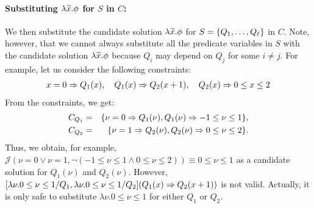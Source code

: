 \paragraph{Substituting \(\lambda \widetilde{x}.\phi\) for \(S\) in \(C\):}
We then substitute the candidate solution \(\lambda \widetilde{x}.\phi\) for
\(S=\{{Q_1,\dots,Q_{\ell}}\}\) in \(C\).  Note, however, that we cannot
always substitute all the predicate variables in \(S\) with the
candidate solution \(\lambda\widetilde{x}.\phi\) because \(Q_i\) may depend on
\(Q_j\) for some \(i \neq j\).  For example, let us consider the
following constraints:
\begin{eqnarray*}
x=0 \Rightarrow Q_1(x), \quad
Q_1(x) \Rightarrow Q_2(x+1), \quad
Q_2(x) \Rightarrow 0 \leq x \leq 2
\end{eqnarray*}
From the constraints, we get:
\begin{eqnarray*}
C_{Q_1}&=&\{\nu=0 \Rightarrow Q_1(\nu), Q_1(\nu) \Rightarrow -1 \leq \nu\leq 1\}, \\
C_{Q_2}&=&\{\nu=1 \Rightarrow Q_2(\nu), Q_2(\nu) \Rightarrow 0 \leq \nu \leq 2\}.
\end{eqnarray*}
Thus, we obtain, for example, \(\mathcal{J}(\nu=0 \lor \nu=1,\neg (-1
\leq \nu\leq 1 \land 0 \leq \nu \leq 2)) \equiv 0 \leq \nu \leq 1\) as a
candidate solution for \(Q_1(\nu)\) and \(Q_2(\nu)\).  However,
\([\lambda\nu.0 \leq \nu \leq 1/Q_1,\lambda \nu.0 \leq \nu \leq
1/Q_2](Q_1(x) \Rightarrow Q_2(x+1))\) is not valid.  Actually, it is only
safe to substitute \(\lambda \nu.0 \leq \nu\leq 1\) for either \(Q_1\)
or \(Q_2\).

